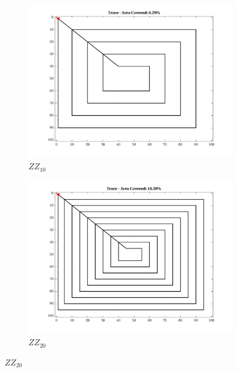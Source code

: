 \begin{figure}[htb!]
	\centering
    \begin{subfigure}[t]{0.3333\textwidth}
        \centering
        \includegraphics[width=\linewidth]{figures/hbresults/path_zz_10p_100x100_sf_100_seed_2.png}
        \ssp
        \captionsetup{skip=0.20\baselineskip,size=footnotesize}
        \caption{$ZZ_{10}$}
    \end{subfigure}%
    \begin{subfigure}[t]{0.3333\textwidth}
        \centering
        \includegraphics[width=\linewidth]{figures/hbresults/path_zz_20p_100x100_sf_100_seed_2.png}
        \ssp
        \captionsetup{skip=0.20\baselineskip,size=footnotesize}
        \caption{$ZZ_{20}$}

\end{subfigure}
\end{figure}
